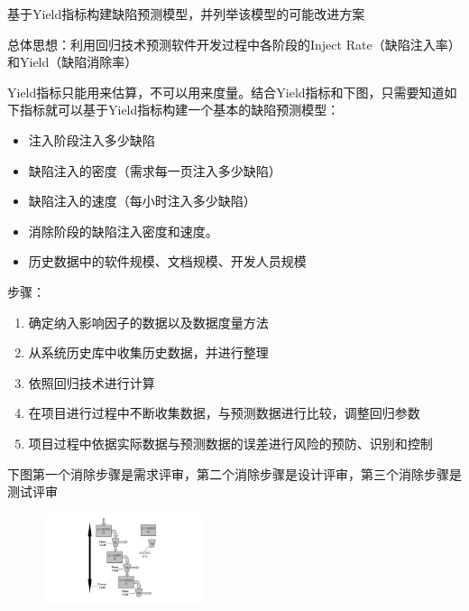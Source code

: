 \begin{problem}
基于Yield指标构建缺陷预测模型，并列举该模型的可能改进方案

总体思想：利用回归技术预测软件开发过程中各阶段的Inject Rate（缺陷注入率）和Yield（缺陷消除率）

Yield指标只能用来估算，不可以用来度量。结合Yield指标和下图，只需要知道如下指标就可以基于Yield指标构建一个基本的缺陷预测模型：
\vspace{-0.8em}
\begin{multicols}{2}
    \begin{itemize}
        \item 注入阶段注入多少缺陷
        \item 缺陷注入的密度（需求每一页注入多少缺陷）
        \item 缺陷注入的速度（每小时注入多少缺陷）
        \item 消除阶段的缺陷注入密度和速度。
        \item 历史数据中的软件规模、文档规模、开发人员规模
    \end{itemize}
\end{multicols}
\vspace{-1em}

步骤：
\vspace{-0.8em}
\begin{multicols}{2}
    \begin{enumerate}[label=\arabic*.]
        \item 确定纳入影响因子的数据以及数据度量方法
        \item 从系统历史库中收集历史数据，并进行整理
        \item 依照回归技术进行计算
        \item 在项目进行过程中不断收集数据，与预测数据进行比较，调整回归参数
        \item 项目过程中依据实际数据与预测数据的误差进行风险的预防、识别和控制
    \end{enumerate}
\end{multicols}
\vspace{-1em}

下图第一个消除步骤是需求评审，第二个消除步骤是设计评审，第三个消除步骤是测试评审

\begin{figure}[H]
    \vspace{-0.5em}
	\centering
	\includegraphics[width=0.42\textwidth]{images/缺陷在开发过程中注入和消除的示意图.pdf}
    \vspace{-1em}
\end{figure}


\end{problem}
